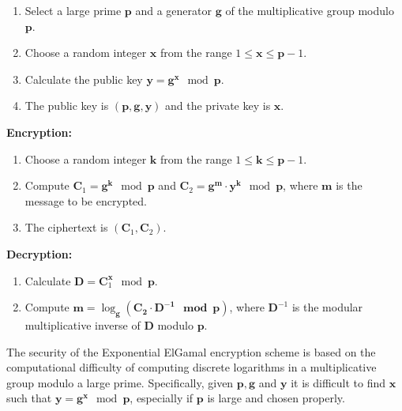 \begin{enumerate}
    \item Select a large prime $\boldsymbol{p}$ and a generator $\boldsymbol{g}$ of the multiplicative group modulo $\boldsymbol{p}$.
    \item Choose a random integer $\boldsymbol{x}$ from the range $1 \leq \boldsymbol{x} \leq \boldsymbol{p}-1$.
    \item Calculate the public key $\boldsymbol{y} = \boldsymbol{g} ^ {\boldsymbol{x}} \mod \boldsymbol{p}$.
    \item The public key is $(\boldsymbol{p}, \boldsymbol{g}, \boldsymbol{y})$ and the private key is $\boldsymbol{x}$.
\end{enumerate}

\textbf{Encryption:}

\begin{enumerate}
    \item Choose a random integer $\boldsymbol{k}$ from the range $1 \leq {\boldsymbol{k}} \leq {\boldsymbol{p}}-1$.
    \item Compute $\boldsymbol{C}_1 = {\boldsymbol{g}}^{\boldsymbol{k}} \mod {\boldsymbol{p}}$ and $\boldsymbol{C}_2 = {{\boldsymbol{g}}^{\boldsymbol{m}}} \cdot {\boldsymbol{y}}^{\boldsymbol{k}} \mod {\boldsymbol{p}}$, where ${\boldsymbol{m}}$ is the message to be encrypted.
    \item The ciphertext is $({\boldsymbol{C}}_1, {\boldsymbol{C}}_2)$.
\end{enumerate}

\textbf{Decryption:}

\begin{enumerate}
    \item Calculate ${\boldsymbol{D}} = {\boldsymbol{C}}_1^{\boldsymbol{x}} \mod {\boldsymbol{p}}$.
    \item Compute $ {\boldsymbol{m}} =\log_{\boldsymbol{g}}(\boldsymbol{{\boldsymbol{C}}_2 \cdot {\boldsymbol{D}}^{-1} \mod {\boldsymbol{p}}})$, where ${\boldsymbol{D}}^{-1}$ is the modular multiplicative inverse of ${\boldsymbol{D}}$ modulo ${\boldsymbol{p}}$.
\end{enumerate}

The security of the Exponential ElGamal encryption scheme is based on the computational difficulty of computing discrete logarithms in a multiplicative group modulo a large prime. Specifically, given $\boldsymbol{p}, \boldsymbol{g}$ and $\boldsymbol{y}$ it is difficult to find ${\boldsymbol{x}}$ such that ${\boldsymbol{y}} = {\boldsymbol{g}}^{\boldsymbol{x}} \mod {\boldsymbol{p}}$, especially if ${\boldsymbol{p}}$ is large and chosen properly.

